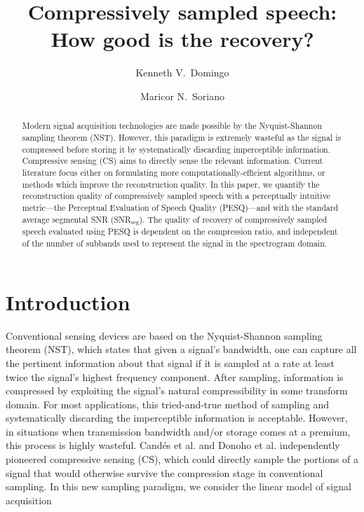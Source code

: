 \documentclass[10pt,a4paper,twoside]{article}
\newcommand{\snrseg}{SNR$_{\mathrm{seg}}$}
\begin{document}
\title{\TitleFont Compressively sampled speech: How good is the recovery?}

\author[*\negthickspace]{Kenneth V.~Domingo}
\author[ ]{Maricor N.~Soriano
\lastauthorsep}


\begin{abstract}
\noindent
Modern signal acquisition technologies are made possible by the Nyquist-Shannon sampling theorem (NST). However, this paradigm is extremely wasteful as the signal is compressed before storing it by systematically discarding imperceptible information. Compressive sensing (CS) aims to directly sense the relevant information. Current literature focus either on formulating more computationally-efficient algorithms, or methods which improve the reconstruction quality. In this paper, we quantify the reconstruction quality of compressively sampled speech with a perceptually intuitive metric---the Perceptual Evaluation of Speech Quality (PESQ)---and with the standard average segmental SNR (\snrseg). The quality of recovery of compressively sampled speech evaluated using PESQ is dependent on the compression ratio, and independent of the number of subbands used to represent the signal in the spectrogram domain.


\end{abstract}

\maketitle
\thispagestyle{titlestyle}

\section{Introduction}\label{sec:intro}
Conventional sensing devices are based on the Nyquist-Shannon sampling theorem (NST), which states that given a signal's bandwidth, one can capture all the pertinent information about that signal if it is sampled at a rate at least twice the signal's highest frequency component. After sampling, information is compressed by exploiting the signal's natural compressibility in some transform domain. For most applications, this tried-and-true method of sampling and systematically discarding the imperceptible information is acceptable. However, in situations when transmission bandwidth and/or storage comes at a premium, this process is highly wasteful. Cand\'{e}s et al. \cite{Candes2006} and Donoho et al. \cite{Donoho2006} independently pioneered compressive sensing (CS), which could directly sample the portions of a signal that would otherwise survive the compression stage in conventional sampling. In this new sampling paradigm, we consider the linear model of signal acquisition
\end{document}
